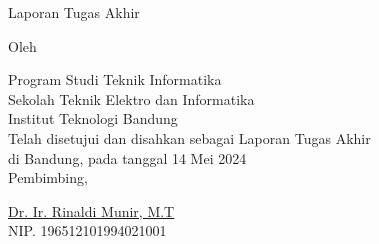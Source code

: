 \clearpage
\pagestyle{empty}

\begin{center}
    \smallskip

    \Large \bfseries \MakeUppercase{\thetitle}
    \vfill

    \Large Laporan Tugas Akhir
    \vfill

    \large Oleh

    \Large \theauthor

    \large Program Studi Teknik Informatika \\

    \normalsize \normalfont
    Sekolah Teknik Elektro dan Informatika \\
    Institut Teknologi Bandung \\

    \vfill
    \normalsize \normalfont
    Telah disetujui dan disahkan sebagai Laporan Tugas Akhir \\
    di Bandung, pada tanggal 14 Mei 2024 \\

    \vspace{0.3cm}
    Pembimbing,

    \vspace{2cm}
    \underline{{{Dr. Ir. Rinaldi Munir, M.T}}} \\
    NIP. {{196512101994021001}}

\end{center}
\clearpage
